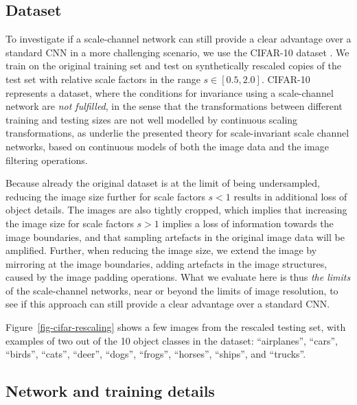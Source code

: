 \documentclass[twocolumn,runningheads]{svjour3}
\begin{document}
\subsection{Dataset}
\label{sec:cifar-scale}

To investigate if a scale-channel network can still provide a clear advantage over a standard CNN in a more challenging scenario, we use the CIFAR-10 dataset \cite{KriHin09-CIFAR}. We train on the original training set and test on synthetically rescaled copies of the test set with relative scale factors in the range $s \in [0.5, 2.0]$.
CIFAR-10 represents a dataset, where the
conditions for invariance using a scale-channel network are \emph{not
fulfilled}, in the sense that the transformations between different training and
testing sizes are not well modelled by continuous scaling
transformations, as underlie the presented theory for scale-invariant scale
channel networks, based on continuous models of both the image data
and the image filtering operations. 

Because already the original dataset is at the limit of being
undersampled, reducing the image size further for scale factors $s < 1$ 
results in additional loss of object details. 
The images are also tightly cropped, which implies that
increasing the image size for scale factors $s > 1$ implies a
loss of information towards the image boundaries, and that
sampling artefacts in the original image
data will be amplified.
Further, when reducing the image size, we extend the image by mirroring at the image boundaries, adding artefacts in the image structures, caused by the image padding operations. What we evaluate here is thus \emph{the limits} of the scale-channel networks, near or beyond the
limits of image resolution, to see if this approach can still provide a clear advantage over a standard CNN. 

Figure~\ref{fig-cifar-rescaling} shows a few images from the rescaled testing set,
with examples of two out of the 10 object classes in the dataset:
``airplanes'', ``cars'', ``birds'', ``cats'', ``deer'', ``dogs'',
``frogs'', ``horses'', ``ships'', and ``trucks''.

\subsection{Network and training details}
\end{document}
